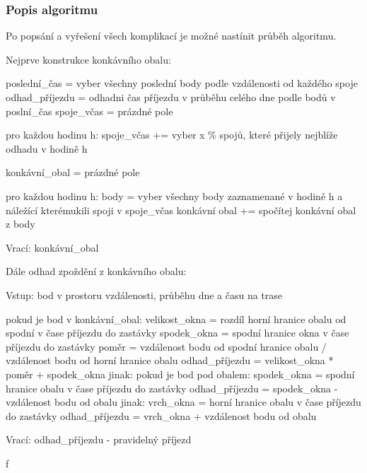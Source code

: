 \subsubsection{Popis algoritmu}

Po popsání a vyřešení všech komplikací je možné nastínit průběh algoritmu.

\bigbreak

Nejprve konstrukce konkávního obalu:

\begin{code}[frame=none]
poslední_čas = vyber všechny poslední body podle vzdálenosti od každého spoje
odhad_příjezdu = odhadni čas příjezdu v průběhu celého dne podle bodů v poslní_čas
spoje_včas = prázdné pole

pro každou hodinu h:
	spoje_včas += vyber x \% spojů, které přijely nejblíže odhadu v hodině h

konkávní_obal = prázdné pole

pro každou hodinu h:
	body = vyber všechny body zaznamenané v hodině h a náležící kterémukili spoji v spoje_včas
	konkávní obal += spočítej konkávní obal z body

Vrací: konkávní_obal
\end{code}

Dále odhad zpoždění z konkávního obalu:

\begin{code}[frame=none]
Vstup: bod v prostoru vzdálenosti, průběhu dne a času na trase

pokud je bod v konkávní_obal:
	velikost_okna = rozdíl horní hranice obalu od spodní v čase příjezdu do zastávky
	spodek_okna = spodní hranice okna v čase příjezdu do zastávky
	poměr = vzdálenost bodu od spodní hranice obalu / vzdálenost bodu od horní hranice obalu
	odhad_příjezdu = velikost_okna * poměr + spodek_okna
jinak:
	pokud je bod pod obalem:
		spodek_okna = spodní hranice obalu v čase příjezdu do zastávky
		odhad_příjezdu = spodek_okna - vzdálenost bodu od obalu
	jinak:
		vrch_okna = horní hranice obalu v čase příjezdu do zastávky
		odhad_příjezdu = vrch_okna + vzdálenost bodu od obalu

Vrací: odhad_příjezdu - pravidelný příjezd
\end{code}













































f
